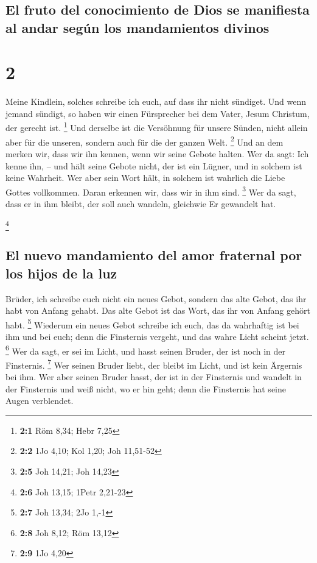 \hypertarget{el-fruto-del-conocimiento-de-dios-se-manifiesta-al-andar-seguxfan-los-mandamientos-divinos}{%
\subsection{El fruto del conocimiento de Dios se manifiesta al andar
según los mandamientos
divinos}\label{el-fruto-del-conocimiento-de-dios-se-manifiesta-al-andar-seguxfan-los-mandamientos-divinos}}

\hypertarget{section-1}{%
\section{2}\label{section-1}}

 Meine Kindlein, solches schreibe ich euch, auf dass ihr
nicht sündiget. Und wenn jemand sündigt, so haben wir einen Fürsprecher
bei dem Vater, Jesum Christum, der gerecht ist. \footnote{\textbf{2:1}
  Röm 8,34; Hebr 7,25}  Und derselbe ist die Versöhnung
für unsere Sünden, nicht allein aber für die unseren, sondern auch für
die der ganzen Welt. \footnote{\textbf{2:2} 1Jo 4,10; Kol 1,20; Joh
  11,51-52}  Und an dem merken wir, dass wir ihn kennen,
wenn wir seine Gebote halten.  Wer da sagt: Ich kenne ihn,
-- und hält seine Gebote nicht, der ist ein Lügner, und in solchem ist
keine Wahrheit.  Wer aber sein Wort hält, in solchem ist
wahrlich die Liebe Gottes vollkommen. Daran erkennen wir, dass wir in
ihm sind. \footnote{\textbf{2:5} Joh 14,21; Joh 14,23} 
Wer da sagt, dass er in ihm bleibt, der soll auch wandeln, gleichwie Er
gewandelt hat.

\footnote{\textbf{2:6} Joh 13,15; 1Petr 2,21-23}

\hypertarget{el-nuevo-mandamiento-del-amor-fraternal-por-los-hijos-de-la-luz}{%
\subsection{El nuevo mandamiento del amor fraternal por los hijos de la
luz}\label{el-nuevo-mandamiento-del-amor-fraternal-por-los-hijos-de-la-luz}}

 Brüder, ich schreibe euch nicht ein neues Gebot, sondern
das alte Gebot, das ihr habt von Anfang gehabt. Das alte Gebot ist das
Wort, das ihr von Anfang gehört habt. \footnote{\textbf{2:7} Joh 13,34;
  2Jo 1,-1}  Wiederum ein neues Gebot schreibe ich euch,
das da wahrhaftig ist bei ihm und bei euch; denn die Finsternis vergeht,
und das wahre Licht scheint jetzt. \footnote{\textbf{2:8} Joh 8,12; Röm
  13,12}  Wer da sagt, er sei im Licht, und hasst seinen
Bruder, der ist noch in der Finsternis. \footnote{\textbf{2:9} 1Jo 4,20}
 Wer seinen Bruder liebt, der bleibt im Licht, und ist
kein Ärgernis bei ihm.  Wer aber seinen Bruder hasst, der
ist in der Finsternis und wandelt in der Finsternis und weiß nicht, wo
er hin geht; denn die Finsternis hat seine Augen verblendet.

